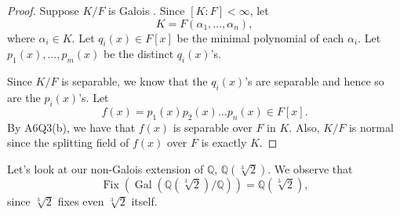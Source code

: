 \documentclass[notoc,notitlepage]{tufte-book}
\DeclareMathOperator{\Gal}{Gal}
\DeclareMathOperator{\Fix}{Fix}
\begin{document}
\begin{proof}
  \noindent
   Suppose $K / F$ is Galois . Since $[ K : F ] < \infty$, let
  \begin{equation*}
    K = F(\alpha_1, \ldots, \alpha_n),
  \end{equation*}
  where $\alpha_i \in K$. Let $q_i(x) \in F[x]$ be the minimal polynomial of
  each $\alpha_i$. Let $p_1(x), \ldots, p_m(x)$ be the distinct $q_i(x)$'s.

  Since $K / F$ is separable, we know that the $q_i(x)$'s are separable and
  hence so are the $p_i(x)$'s. Let
  \begin{equation*}
    f(x) = p_1(x) p_2(x) \hdots p_n(x) \in F[x].
  \end{equation*}
  By A6Q3(b), we have that $f(x)$ is separable over $F$ in $K$. Also, $K / F$ is
  normal since the splitting field of $f(x)$ over $F$ is exactly $K$.
\end{proof}

\begin{eg}
  Let's look at our non-Galois extension of $\mathbb{Q}$,
  $\mathbb{Q}(\sqrt[3]{2})$. We observe that
  \begin{equation*}
    \Fix ( \Gal( \mathbb{Q}(\sqrt[3]{2}) / \mathbb{Q} ) ) =
    \mathbb{Q}(\sqrt[3]{2}),
  \end{equation*}
  since $\sqrt[3]{2}$ fixes even $\sqrt[3]{2}$ itself.
\end{eg}
\end{document}
